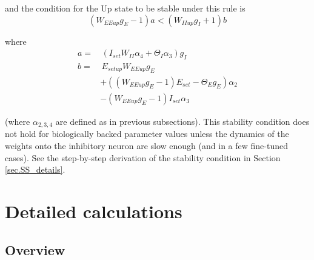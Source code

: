 \documentclass[
twocolumn,
]{article}
\newcommand{\EE}{\mathit{EE}}
\newcommand{\II}{\mathit{II}}
\newcommand{\set}{\mathit{set}}
\newcommand{\up}{\mathit{up}}
\begin{document}
\noindent and the condition for the Up state to be stable under this rule is
\begin{equation}
(W_{\EE\up}g_E - 1)a < (W_{\II\up}g_I + 1)b
\label{eq.SScond_summary}
\end{equation}

\noindent where
\begin{displaymath}
\begin{aligned}
a = & \, (I_{\set} W_{\II} \alpha_4 + \Theta_I \alpha_3)g_I \\
b = & \, E_{\set\up} W_{\EE\up}g_E \\
& + ((W_{\EE\up} g_E - 1) E_{\set} - \Theta_E g_E)\alpha_2 \\
& - (W_{\EE\up} g_E - 1) I_{\set} \alpha_3
\end{aligned}
\end{displaymath}

\noindent (where $\alpha_{2,3,4}$ are defined as in previous subsections). This stability condition does not hold for biologically backed parameter values unless the dynamics of the weights onto the inhibitory neuron are slow enough (and in a few fine-tuned cases). See the step-by-step derivation of the stability condition in Section \ref{sec.SS_details}.





\section{Detailed calculations}

\subsection{Overview}
\end{document}
